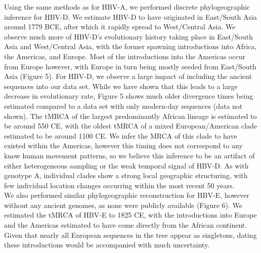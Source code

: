 Using the same methods as for HBV-A, we performed discrete phylogeographic inference for HBV-D. We estimate HBV-D to have originated in East/South Asia around 1779 BCE, after which it rapidly spread to West/Central Asia. We observe much more of HBV-D’s evolutionary history taking place in East/South Asia and West/Central Asia, with the former spawning introductions into Africa, the Americas, and Europe. Most of the introductions into the Americas occur from Europe however, with Europe in turn being mostly seeded from East/South Asia (Figure 5). For HBV-D, we observe a large impact of including the ancient sequences into our data set. While we have shown that this leads to a large decrease in evolutionary rate, Figure 5 shows much older divergence times being estimated compared to a data set with only modern-day sequences (data not shown). The tMRCA of the largest predominantly African lineage is estimated to be around 550 CE, with the oldest tMRCA of a mixed European/American clade estimated to be around 1100 CE. We infer the MRCA of this clade to have existed within the Americas, however this timing does not correspond to any know human movement patterns, so we believe this inference to be an artifact of either heterogeneous sampling or the weak temporal signal of HBV-D. As with genotype A, individual clades show a strong local geographic structuring, with few individual location changes occurring within the most recent 50 years.\\

We also performed similar phylogeographic reconstruction for HBV-E, however without any ancient genomes, as none were publicly available (Figure 6). We estimated the tMRCA of HBV-E to 1825 CE, with the introductions into Europe and the Americas estimated to have come directly from the African continent. Given that nearly all European sequences in the tree appear as singletons, dating these introductions would be accompanied with much uncertainty.


